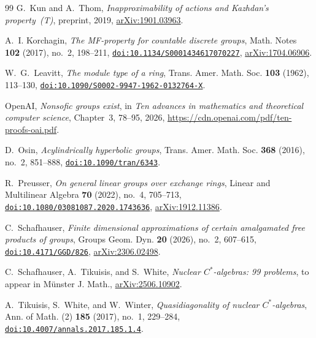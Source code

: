 \documentclass[11pt]{amsart}
\newcommand{\doi}[1]{\href{https://doi.org/#1}{\nolinkurl{doi:#1}}}
\theoremstyle{plain}
\begin{document}
\begin{thebibliography}{99}
G.~Kun and A.~Thom,
\emph{Inapproximability of actions and Kazhdan's property~\textup{(T)}},
preprint, 2019,
\href{https://arxiv.org/abs/1901.03963}{arXiv:1901.03963}.

A.~I. Korchagin,
\emph{The MF-property for countable discrete groups},
Math. Notes \textbf{102} (2017), no.~2, 198--211,
\doi{10.1134/S0001434617070227},
\href{https://arxiv.org/abs/1704.06906}{arXiv:1704.06906}.

W.~G.~Leavitt,
\emph{The module type of a ring},
Trans. Amer. Math. Soc. \textbf{103} (1962), 113--130,
\doi{10.1090/S0002-9947-1962-0132764-X}.

OpenAI,
\emph{Nonsofic groups exist},
in \emph{Ten advances in mathematics and theoretical computer science},
Chapter~3, 78--95, 2026,
\url{https://cdn.openai.com/pdf/ten-proofs-oai.pdf}.

D.~Osin,
\emph{Acylindrically hyperbolic groups},
Trans. Amer. Math. Soc. \textbf{368} (2016), no.~2, 851--888,
\doi{10.1090/tran/6343}.

R.~Preusser,
\emph{On general linear groups over exchange rings},
Linear and Multilinear Algebra \textbf{70} (2022), no.~4, 705--713,
\doi{10.1080/03081087.2020.1743636},
\href{https://arxiv.org/abs/1912.11386}{arXiv:1912.11386}.

C.~Schafhauser,
\emph{Finite dimensional approximations of certain amalgamated free
products of groups},
Groups Geom. Dyn. \textbf{20} (2026), no.~2, 607--615,
\doi{10.4171/GGD/826},
\href{https://arxiv.org/abs/2306.02498}{arXiv:2306.02498}.

C.~Schafhauser, A.~Tikuisis, and S.~White,
\emph{Nuclear $C^*$-algebras: 99 problems},
to appear in M\"unster J. Math.,
\href{https://arxiv.org/abs/2506.10902}{arXiv:2506.10902}.

A.~Tikuisis, S.~White, and W.~Winter,
\emph{Quasidiagonality of nuclear $C^*$-algebras},
Ann. of Math. (2) \textbf{185} (2017), no.~1, 229--284,
\doi{10.4007/annals.2017.185.1.4}.

\end{thebibliography}
\end{document}

